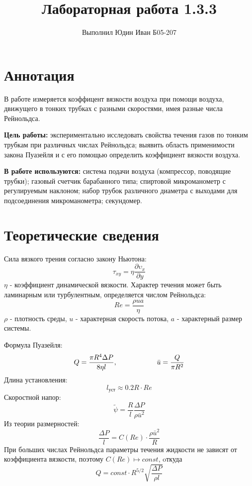 \documentclass[a4paper,12pt]{article} %
\title{Лабораторная работа 1.3.3}
\author{Выполнил Юдин Иван Б05-207}
\begin{document}
  \maketitle

  \section*{Аннотация}
В работе измеряется коэффицент вязкости воздуха при помощи воздуха, движущего в тонких трубках с разными скоростями, имея разные числа Рейнольдса.

\textbf{Цель работы:} экспериментально исследовать свойства течения газов по тонким трубкам при различных числах Рейнольдса; выявить область применимости закона Пуазейля и с его помощью определить коэффициент вязкости воздуха.

\textbf{В работе используются:}  система подачи воздуха (компрессор, поводящие трубки); газовый счетчик барабанного типа; спиртовой микроманометр с регулируемым наклоном; набор трубок различного диаметра с выходами для подсоединения микроманометра; секундомер.

\section*{Теоретические сведения}
Сила вязкого трения согласно закону Ньютона:
\begin{equation}
\tau_{xy} = \eta \frac{\partial \upsilon_x}{\partial y}
\end{equation}
$\eta$ - коэффициент динамической вязкости.
Характер течения может быть ламинарным или турбулентным, определяется числом Рейнольдса:
\begin{equation}
Re = \frac{\rho u a}{\eta}
\end{equation} 
$\rho$ - плотность среды, $u$ - характерная скорость потока, $a$ - характерный размер системы.

Формула Пуазейля:
\begin{equation}
Q = \frac{\pi R^4\Delta P}{8\eta l}, \hspace*{20mm} \bar{u} = \frac{Q}{\pi R^2}
\end{equation}
Длина установления:
\begin{equation}
\label{длина}
l_{уст} \approx 0.2R\cdot Re
\end{equation}
Скоростной напор:
\begin{equation}
\tilde{\psi} = \frac{R}{l}\frac{\Delta P}{\rho \bar{u}^2}
\end{equation}
Из теории размерностей:
\begin{equation}
\frac{\Delta P}{l} = C(Re)\cdot \frac{\rho \bar{u}^2}{R}
\end{equation}
При больших числах Рейнольдса параметры течения жидкости не зависят от коэффициента вязкости, поэтому $C(Re)\mapsto const$, oткуда
\begin{equation}
Q = const \cdot R^{5/2} \sqrt{\frac{\Delta P}{\rho l}}
\end{equation}
\end{document}
